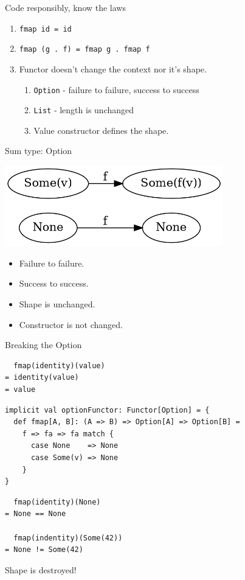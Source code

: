 \documentclass[presentation,aspectratio=169,smaller]{beamer}
\begin{document}
\begin{frame}[label={sec:orgd380961},fragile]{Code responsibly, know the laws}
 \begin{enumerate}
\item <1-> \texttt{fmap id = id}
\item <2-> \texttt{fmap (g . f) = fmap g . fmap f}
\item <3-> Functor doesn't change the context nor it's shape.
\begin{enumerate}
\item \texttt{Option} - failure to failure, success to success
\item \texttt{List} - length is unchanged
\item Value constructor defines the shape.
\end{enumerate}
\end{enumerate}
\end{frame}

\begin{frame}[label={sec:org12bc762}]{Sum type: Option}
\begin{center}
\includegraphics[height=3.5cm]{.dot/functor-option.png}
\end{center}

\begin{itemize}
\item Failure to failure.
\item Success to success.
\item Shape is unchanged.
\item Constructor is not changed.
\end{itemize}
\end{frame}

\begin{frame}[label={sec:org635eb54},fragile]{Breaking the Option}
 \begin{verbatim}
  fmap(identity)(value)
= identity(value)
= value
\end{verbatim}

\pause

\begin{verbatim}
implicit val optionFunctor: Functor[Option] = {
  def fmap[A, B]: (A => B) => Option[A] => Option[B] =
    f => fa => fa match {
      case None    => None
      case Some(v) => None
    }
}
\end{verbatim}

\pause

\begin{verbatim}
  fmap(identity)(None)
= None == None

  fmap(indentity)(Some(42))
= None != Some(42)
\end{verbatim}

Shape is destroyed!
\end{frame}
\end{document}
